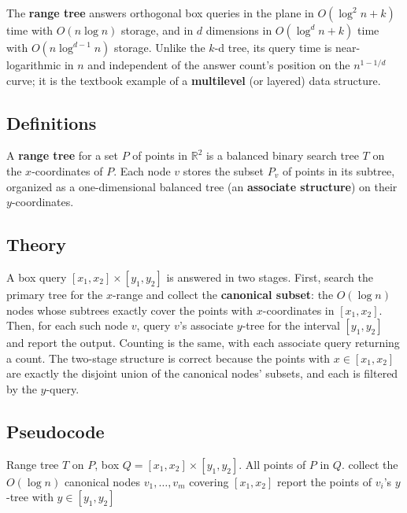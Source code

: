 The \textbf{range tree} answers orthogonal box queries in
the plane in $O(\log^2 n + k)$ time with $O(n \log n)$ storage, and in
$d$ dimensions in $O(\log^d n + k)$ time with $O(n \log^{d-1} n)$ storage.
Unlike the $k$-d tree, its query time is near-logarithmic in $n$ and
independent of the answer count's position on the $n^{1-1/d}$ curve; it is
the textbook example of a \textbf{multilevel} (or layered) data structure.

\subsection{Definitions}

\begin{definition}\label{def:range_tree}
  A \textbf{range tree} for a set $P$ of points in $\mathbb{R}^2$ is a
  balanced binary search tree $T$ on the $x$-coordinates of $P$. Each node
  $v$ stores the subset $P_v$ of points in its subtree, organized as a
  one-dimensional balanced tree (an \textbf{associate structure}) on their
  $y$-coordinates.
\end{definition}

\subsection{Theory}

A box query $[x_1,x_2] \times [y_1,y_2]$ is answered in two stages. First,
search the primary tree for the $x$-range and collect the
\textbf{canonical subset}: the $O(\log n)$ nodes whose subtrees exactly
cover the points with $x$-coordinates in $[x_1,x_2]$. Then, for each such
node $v$, query $v$'s associate $y$-tree for the interval $[y_1,y_2]$ and
report the output. Counting is the same, with each associate query
returning a count. The two-stage structure is correct because the points
with $x \in [x_1,x_2]$ are exactly the disjoint union of the canonical
nodes' subsets, and each is filtered by the $y$-query.

\subsection{Pseudocode}

\begin{algorithm}[htbp]
\caption{2D Orthogonal Range Query}
\label{alg:range_tree_query}
\begin{algorithmic}[1]
\Require Range tree $T$ on $P$, box $Q = [x_1,x_2] \times [y_1,y_2]$.
\Ensure All points of $P$ in $Q$.
  \State collect the $O(\log n)$ canonical nodes $v_1,\dots,v_m$ covering $[x_1,x_2]$
    \State report the points of $v_i$'s $y$-tree with $y \in [y_1,y_2]$
  \EndFor
\EndFunction
\end{algorithmic}
\end{algorithm}

